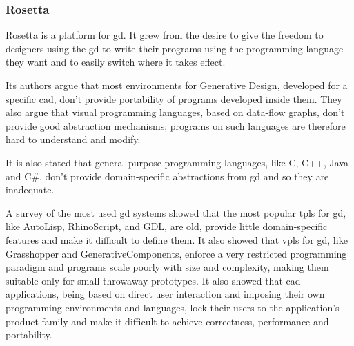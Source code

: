 \documentclass{./llncs2e/llncs}
\begin{document}
	

\subsubsection{Rosetta\cite{de2012modern}}
	Rosetta is a platform for \ac{gd}.
	It grew from the desire to give the freedom to designers using the \ac{gd} to write their programs using the programming language they want and to easily switch where it takes effect.
	
	Its authors argue that most environments for Generative Design, developed for a specific \ac{cad}, don't provide portability of programs developed inside them.
	They also argue that visual programming languages, based on data-flow graphs, don't provide good abstraction mechanisms; programs on such languages are therefore hard to understand and modify.
	
	It is also stated that general purpose programming languages, like C, C++, Java and C\#, don't provide domain-specific abstractions from \ac{gd} and so they are inadequate.
	
	A survey of the most used \ac{gd} systems showed that the most popular \ac{tpl}s for \ac{gd}, like AutoLisp, RhinoScript, and GDL, are old, provide little domain-specific features and make it difficult to define them.
	It also showed that \ac{vpl}s for \ac{gd}, like Grasshopper and GenerativeComponents, enforce a very restricted programming paradigm and programs scale poorly with size and complexity, making them suitable only for small throwaway prototypes. 
	It also showed that \ac{cad} applications, being based on direct user interaction and imposing their own programming environments and languages, lock their users to the application's product family and make it difficult to achieve correctness, performance and portability.
	
\end{document}
